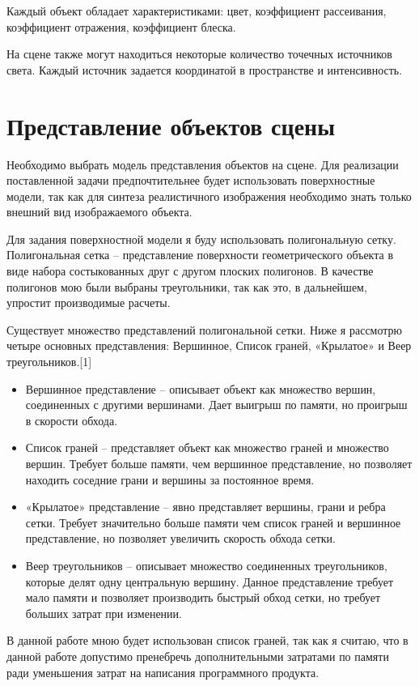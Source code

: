 \documentclass[12pt]{report}
\begin{document}
		Каждый объект обладает характеристиками: цвет, коэффициент рассеивания, коэффициент отражения, коэффициент блеска.
		
		На сцене также могут находиться некоторые количество точечных источников света. Каждый источник задается координатой в пространстве и интенсивность.
		
	\section{Представление объектов сцены}
	
	Необходимо выбрать модель представления объектов на сцене. Для реализации поставленной задачи предпочтительнее будет использовать поверхностные модели, так как для синтеза реалистичного изображения необходимо знать только внешний вид изображаемого объекта.
	
	Для задания поверхностной модели я буду использовать полигональную сетку. Полигональная сетка – представление поверхности геометрического объекта в виде набора состыкованных друг с другом плоских полигонов. В качестве полигонов мою были выбраны треугольники, так как это, в дальнейшем, упростит производимые расчеты.
	
	Существует множество представлений полигональной сетки. Ниже я рассмотрю четыре основных представления: Вершинное, Список граней, «Крылатое» и Веер треугольников.[1]
	
	\begin{itemize}
		\item Вершинное представление – описывает объект как множество вершин, соединенных с другими вершинами. Дает выигрыш по памяти, но проигрыш в скорости обхода.
		\item Список граней – представляет объект как множество граней и множество вершин. Требует больше памяти, чем вершинное представление, но позволяет находить соседние грани и вершины за постоянное время.
		\item «Крылатое» представление – явно представляет вершины, грани и ребра сетки. Требует значительно больше памяти чем список граней и вершинное представление, но позволяет увеличить скорость обхода сетки.
		\item Веер треугольников – описывает множество соединенных треугольников, которые делят одну центральную вершину. Данное представление требует мало памяти и позволяет производить быстрый обход сетки, но требует больших затрат при изменении.
	\end{itemize}

	В данной работе мною будет использован список граней, так как я считаю, что в данной работе допустимо пренебречь дополнительными затратами по памяти ради уменьшения затрат на написания программного продукта.
\end{document}
